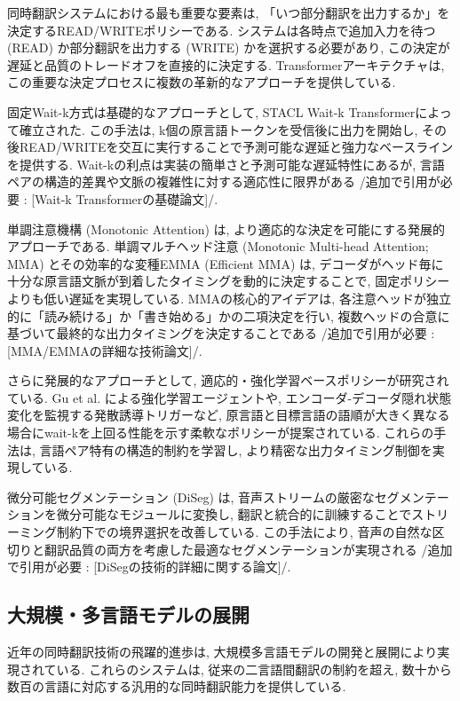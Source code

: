 同時翻訳システムにおける最も重要な要素は, 「いつ部分翻訳を出力するか」を決定するREAD/WRITEポリシーである.
システムは各時点で追加入力を待つ (READ) か部分翻訳を出力する (WRITE) かを選択する必要があり, この決定が遅延と品質のトレードオフを直接的に決定する.
Transformerアーキテクチャは, この重要な決定プロセスに複数の革新的なアプローチを提供している.

固定Wait-k方式は基礎的なアプローチとして, STACL Wait-k Transformerによって確立された.
この手法は, k個の原言語トークンを受信後に出力を開始し, その後READ/WRITEを交互に実行することで予測可能な遅延と強力なベースラインを提供する.
Wait-kの利点は実装の簡単さと予測可能な遅延特性にあるが, 言語ペアの構造的差異や文脈の複雑性に対する適応性に限界がある {/追加で引用が必要 : [Wait-k Transformerの基礎論文]/}.

単調注意機構 (Monotonic Attention) は, より適応的な決定を可能にする発展的アプローチである.
単調マルチヘッド注意 (Monotonic Multi-head Attention; MMA) とその効率的な変種EMMA (Efficient MMA) は, デコーダがヘッド毎に十分な原言語文脈が到着したタイミングを動的に決定することで, 固定ポリシーよりも低い遅延を実現している.
MMAの核心的アイデアは, 各注意ヘッドが独立的に「読み続ける」か「書き始める」かの二項決定を行い, 複数ヘッドの合意に基づいて最終的な出力タイミングを決定することである {/追加で引用が必要 : [MMA/EMMAの詳細な技術論文]/}.

さらに発展的なアプローチとして, 適応的・強化学習ベースポリシーが研究されている.
Gu et al. \cite{gu2017learning} による強化学習エージェントや, エンコーダ-デコーダ隠れ状態変化を監視する発散誘導トリガーなど, 原言語と目標言語の語順が大きく異なる場合にwait-kを上回る性能を示す柔軟なポリシーが提案されている.
これらの手法は, 言語ペア特有の構造的制約を学習し, より精密な出力タイミング制御を実現している.

微分可能セグメンテーション (DiSeg) は, 音声ストリームの厳密なセグメンテーションを微分可能なモジュールに変換し, 翻訳と統合的に訓練することでストリーミング制約下での境界選択を改善している.
この手法により, 音声の自然な区切りと翻訳品質の両方を考慮した最適なセグメンテーションが実現される {/追加で引用が必要 : [DiSegの技術的詳細に関する論文]/}.

\subsection{大規模・多言語モデルの展開}

近年の同時翻訳技術の飛躍的進歩は, 大規模多言語モデルの開発と展開により実現されている.
これらのシステムは, 従来の二言語間翻訳の制約を超え, 数十から数百の言語に対応する汎用的な同時翻訳能力を提供している.

